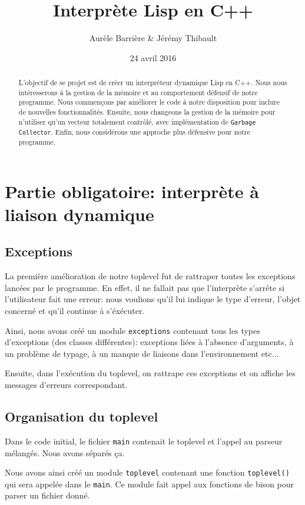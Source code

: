 \documentclass[12pt]{article}
\title{Interprète Lisp en C++}
\author{Aurèle Barrière \& Jérémy Thibault}
\date{24 avril 2016}
\def\code #1{\lstinline{#1}}
\begin{document}
\maketitle
\tableofcontents

\begin{abstract}
  L'objectif de se projet est de créer un interpréteur dynamique Lisp en C++. Nous nous intéresserons à la gestion de la mémoire et au comportement défensif de notre programme. Nous commençons par améliorer le code à notre disposition pour inclure de nouvelles fonctionnalités. Ensuite, nous changeons la gestion de la mémoire pour n'utiliser qu'un vecteur totalement contrôlé, avec implémentation de \code{Garbage Collector}. Enfin, nous considérons une approche plus défensive pour notre programme.
\end{abstract}
\newpage

\section{Partie obligatoire: interprète à liaison dynamique}

\subsection{Exceptions}
La première amélioration de notre toplevel fut de rattraper toutes les exceptions lancées par le programme. En effet, il ne fallait pas que l'interprète s'arrête si l'utilisateur fait une erreur: nous voulions qu'il lui indique le type d'erreur, l'objet concerné et qu'il continue à s'éxécuter.

Ainsi, nous avons créé un module \code{exceptions} contenant tous les types d'exceptions (des classes différentes): exceptions liées à l'absence d'arguments, à un problème de typage, à un manque de liaisons dans l'environnement etc...

Ensuite, dans l'exécution du toplevel, on rattrape ces exceptions et on affiche les messages d'erreurs correspondant.

\subsection{Organisation du toplevel}

Dans le code initial, le fichier \code{main} contenait le toplevel et l'appel au parseur mélangés. Nous avons séparés ça.

Nous avons ainsi créé un module \code{toplevel} contenant une fonction \code{toplevel()} qui sera appelée dans le \code{main}. Ce module fait appel aux fonctions de bison pour parser un fichier donné.
\end{document}
